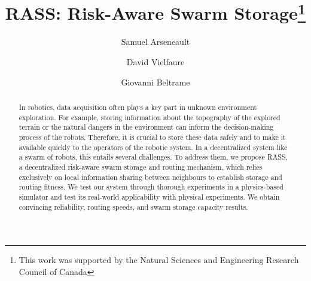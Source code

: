 \documentclass[runningheads]{llncs}
\begin{document}
%
\title{RASS: Risk-Aware Swarm Storage\thanks{This work was supported by the Natural Sciences and Engineering Research Council of Canada}}
%
%
\author{Samuel Arseneault \and
David Vielfaure \and
Giovanni Beltrame}
%
%
%
\maketitle              %
%

\begin{abstract}
In robotics, data acquisition often plays a key part in
unknown environment exploration. For example, storing information about the topography of the explored terrain or the natural dangers in the environment can
inform the decision-making process of the robots. 
Therefore, it is crucial to store these data safely
and to make it available quickly to the operators of the robotic
system. In a decentralized system like a swarm of robots, this
entails several challenges. To address them, we propose RASS, a
decentralized risk-aware swarm storage and routing mechanism,
which relies exclusively on local information sharing between neighbours to establish
storage and routing fitness. We test our system through thorough experiments in a physics-based simulator and test its real-world applicability with physical experiments. We obtain convincing reliability, routing speeds, and swarm storage capacity results.

\end{abstract}
%
%
%
\end{document}
